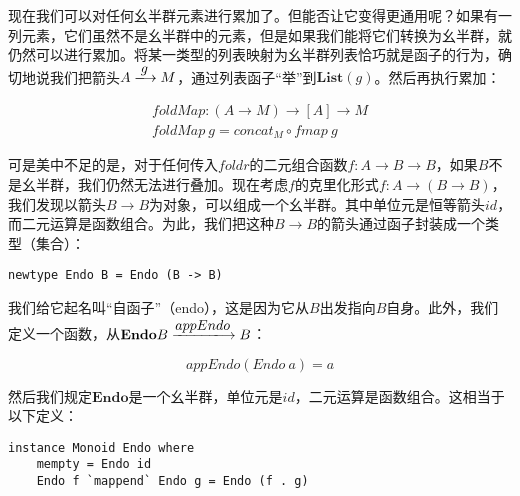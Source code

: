 \documentclass{article}
\begin{document}
现在我们可以对任何幺半群元素进行累加了。但能否让它变得更通用呢？如果有一列元素，它们虽然不是幺半群中的元素，但是如果我们能将它们转换为幺半群，就仍然可以进行累加。将某一类型的列表映射为幺半群列表恰巧就是函子的行为，确切地说我们把箭头$A \arrowto{g} M$，通过列表函子“举”到$\mathbf{List}(g)$。然后再执行累加：

\begin{center}
\end{center}

\[
\begin{array}{l}
foldMap : (A \to M) \to [A] \to M \\
foldMap\ g = concat_M \circ fmap\ g
\end{array}
\]

可是美中不足的是，对于任何传入$foldr$的二元组合函数$f : A \to B \to B$，如果$B$不是幺半群，我们仍然无法进行叠加。现在考虑$f$的克里化形式$f : A \to (B \to B)$，我们发现以箭头$B \to B$为对象，可以组成一个幺半群。其中单位元是恒等箭头$id$，而二元运算是函数组合。为此，我们把这种$B \to B$的箭头通过函子封装成一个类型（集合）：

\lstset{frame=none}
\begin{lstlisting}[style=Haskell]
newtype Endo B = Endo (B -> B)
\end{lstlisting}

我们给它起名叫“自函子”（endo），这是因为它从$B$出发指向$B$自身。此外，我们定义一个函数，从$\mathbf{Endo}B \arrowto{appEndo} B$：

\[
appEndo(Endo\ a) = a
\]

然后我们规定$\mathbf{Endo}$是一个幺半群，单位元是$id$，二元运算是函数组合。这相当于以下定义：

\lstset{frame=single}
\begin{lstlisting}[style=Haskell]
instance Monoid Endo where
    mempty = Endo id
    Endo f `mappend` Endo g = Endo (f . g)
\end{lstlisting}
\end{document}
